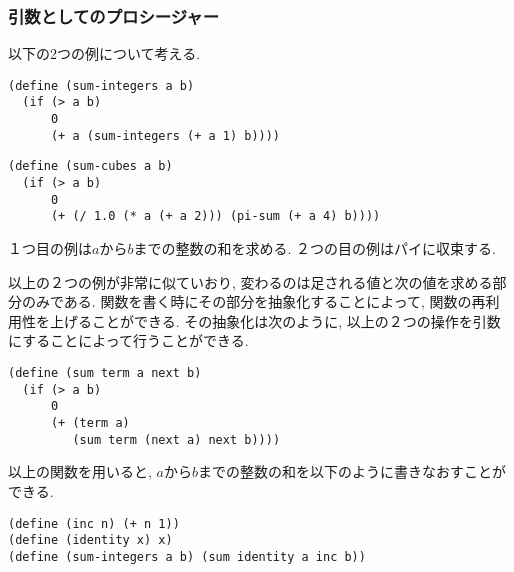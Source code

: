 \subsubsection{引数としてのプロシージャー}
以下の2つの例について考える.
%
\begin{lstlisting}[basicstyle=\footnotesize,title=$a$から$b$までの整数の和]
(define (sum-integers a b)
  (if (> a b)
      0
      (+ a (sum-integers (+ a 1) b))))
\end{lstlisting}
%
\begin{lstlisting}[basicstyle=\footnotesize,title=$\pi$の数列]
(define (sum-cubes a b)
  (if (> a b)
      0
      (+ (/ 1.0 (* a (+ a 2))) (pi-sum (+ a 4) b))))
\end{lstlisting}

１つ目の例は$a$から$b$までの整数の和を求める. ２つの目の例はパイに収束する.

以上の２つの例が非常に似ていおり, 変わるのは足される値と次の値を求める部分のみである.
関数を書く時にその部分を抽象化することによって, 関数の再利用性を上げることができる.
その抽象化は次のように, 以上の２つの操作を引数にすることによって行うことができる.
\newpage
\begin{lstlisting}[basicstyle=\footnotesize,title=一般的な和の関数]
(define (sum term a next b)
  (if (> a b)
      0
      (+ (term a)
         (sum term (next a) next b))))
\end{lstlisting}

以上の関数を用いると, $a$から$b$までの整数の和を以下のように書きなおすことができる.
%
\begin{lstlisting}[basicstyle=\footnotesize,title=一般的な和を用いた$a$から$b$までの整数]
(define (inc n) (+ n 1))
(define (identity x) x)
(define (sum-integers a b) (sum identity a inc b))
\end{lstlisting}
